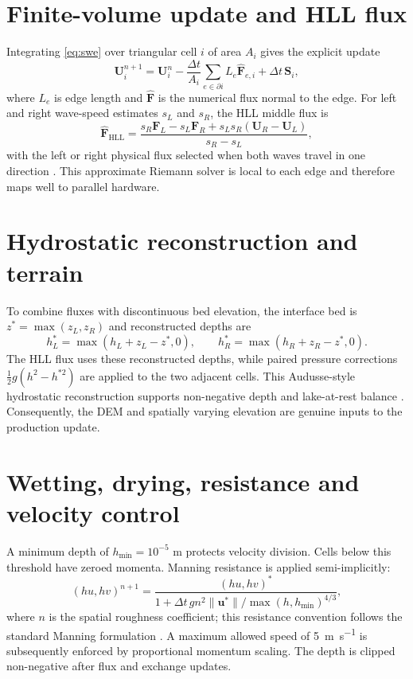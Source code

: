 \documentclass[11pt,a4paper,oneside]{report}
\begin{document}
\section{Finite-volume update and HLL flux}
Integrating \cref{eq:swe} over triangular cell $i$ of area $A_i$ gives the explicit update
\begin{equation}
 \bm U_i^{n+1}=\bm U_i^n-
 \frac{\Delta t}{A_i}\sum_{e\in\partial i}L_e\widehat{\bm F}_{e,i}
 +\Delta t\,\bm S_i,
 \label{eq:fvm}
\end{equation}
where $L_e$ is edge length and $\widehat{\bm F}$ is the numerical flux normal to the edge.
For left and right wave-speed estimates $s_L$ and $s_R$, the HLL middle flux is
\begin{equation}
 \widehat{\bm F}_{\mathrm{HLL}}=
 \frac{s_R\bm F_L-s_L\bm F_R+s_Ls_R(\bm U_R-\bm U_L)}{s_R-s_L},
\end{equation}
with the left or right physical flux selected when both waves travel in one direction
\cite{harten1983}. This approximate Riemann solver is local to each edge and therefore maps
well to parallel hardware.

\section{Hydrostatic reconstruction and terrain}
To combine fluxes with discontinuous bed elevation, the interface bed is
$z^*=\max(z_L,z_R)$ and reconstructed depths are
\begin{equation}
 h_L^*=\max(h_L+z_L-z^*,0),\qquad
 h_R^*=\max(h_R+z_R-z^*,0).
\end{equation}
The HLL flux uses these reconstructed depths, while paired pressure corrections
$\tfrac12g(h^2-h^{*2})$ are applied to the two adjacent cells. This Audusse-style
hydrostatic reconstruction supports non-negative depth and lake-at-rest balance
\cite{audusse2004}. Consequently, the DEM and spatially varying elevation are genuine
inputs to the production update.

\section{Wetting, drying, resistance and velocity control}
A minimum depth of $h_{\min}=10^{-5}$ m protects velocity division. Cells below this
threshold have zeroed momenta. Manning resistance is applied semi-implicitly:
\begin{equation}
 (hu,hv)^{n+1}=\frac{(hu,hv)^*}
 {1+\Delta t\,g n^2\lVert\bm u^*\rVert/
        \max(h,h_{\min})^{4/3}},
 \label{eq:manning}
\end{equation}
where $n$ is the spatial roughness coefficient; this resistance convention follows the
standard Manning formulation \cite{chow1959}. A maximum allowed speed of
\SI{5}{\metre\per\second} is subsequently enforced by proportional momentum scaling. The
depth is clipped non-negative after flux and exchange updates.
\end{document}
